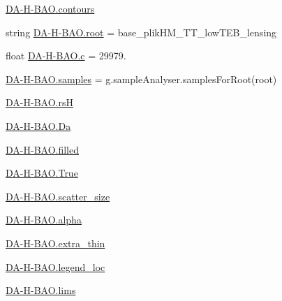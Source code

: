 \begin{DoxyCompactItemize}
\item 
\mbox{\hyperlink{namespaceDA-H-BAO_a41e15db1b442abfce1035d4079e42ef9}{D\+A-\/\+H-\/\+B\+A\+O.\+contours}}
\item 
string \mbox{\hyperlink{namespaceDA-H-BAO_a6e2eec154420e213caf6c80494188a16}{D\+A-\/\+H-\/\+B\+A\+O.\+root}} = \textquotesingle{}base\+\_\+plik\+H\+M\+\_\+\+T\+T\+\_\+low\+T\+E\+B\+\_\+lensing\textquotesingle{}
\item 
float \mbox{\hyperlink{namespaceDA-H-BAO_a46be8ff9e149d52499b170dfd3ebc857}{D\+A-\/\+H-\/\+B\+A\+O.\+c}} = 29979.
\item 
\mbox{\hyperlink{namespaceDA-H-BAO_a21996e2084da31e693af71a0bb61918b}{D\+A-\/\+H-\/\+B\+A\+O.\+samples}} = g.\+sample\+Analyser.\+samples\+For\+Root(root)
\item 
\mbox{\hyperlink{namespaceDA-H-BAO_a2fe333a1d3023039d2fc4abcfe63462c}{D\+A-\/\+H-\/\+B\+A\+O.\+rsH}}
\item 
\mbox{\hyperlink{namespaceDA-H-BAO_a5362e5d5614f1193a561617248ff16f8}{D\+A-\/\+H-\/\+B\+A\+O.\+Da}}
\item 
\mbox{\hyperlink{namespaceDA-H-BAO_a856ce133cc51251d664df4470b99860f}{D\+A-\/\+H-\/\+B\+A\+O.\+filled}}
\item 
\mbox{\hyperlink{namespaceDA-H-BAO_a8ee57864b6ab9f26b5745c6f0a30304a}{D\+A-\/\+H-\/\+B\+A\+O.\+True}}
\item 
\mbox{\hyperlink{namespaceDA-H-BAO_a04d961f655b4aff191d138794f4fc1e3}{D\+A-\/\+H-\/\+B\+A\+O.\+scatter\+\_\+size}}
\item 
\mbox{\hyperlink{namespaceDA-H-BAO_aa45eb34ce971f62515d0abcd74b29112}{D\+A-\/\+H-\/\+B\+A\+O.\+alpha}}
\item 
\mbox{\hyperlink{namespaceDA-H-BAO_a918edd43521309f8f7fc1a5532a2b2a6}{D\+A-\/\+H-\/\+B\+A\+O.\+extra\+\_\+thin}}
\item 
\mbox{\hyperlink{namespaceDA-H-BAO_a0da8382cf6dbec19c8ca572d626119a5}{D\+A-\/\+H-\/\+B\+A\+O.\+legend\+\_\+loc}}
\item 
\mbox{\hyperlink{namespaceDA-H-BAO_a71da5ade75da49f147c72a09ccbf17f7}{D\+A-\/\+H-\/\+B\+A\+O.\+lims}}
\end{DoxyCompactItemize}
